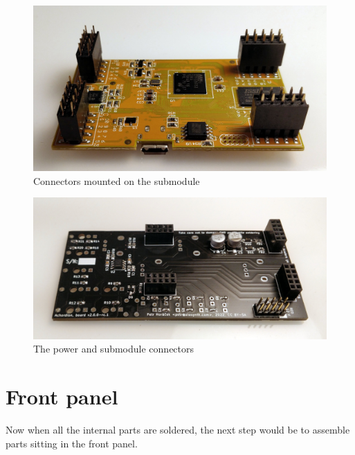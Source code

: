 \documentclass[10pt,a4paper,twocolumn]{article}
\begin{document}
\begin{figure}[h]
  \centering
  \includegraphics[width=\linewidth]{p02.jpg}
  \caption{Connectors mounted on the submodule}
  \label{daisy}
\end{figure}

\begin{figure}[h]
  \centering
  \includegraphics[width=\linewidth]{p03.jpg}
  \caption{The power and submodule connectors}
  \label{connectors}
\end{figure}

\clearpage

\section{Front panel}

Now when all the internal parts are soldered, the next step would be to assemble
parts sitting in the front panel.
\end{document}
